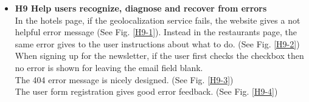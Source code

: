 \begin{itemize}
\begin{figure}[!ht]
\begin{minipage}{\linewidth}
                \centering
                \captionsetup{justification=centering}
                \caption{}
                \label{H8-1}
            \end{minipage}
\end{figure}
\begin{figure}[!ht]
    \begin{minipage}{\linewidth}
        \centering
        \captionsetup{justification=centering}
        \caption{}
        \label{H8-2}
    \end{minipage}
\end{figure}
    \item \textbf{H9 Help users recognize, diagnose and recover from errors}\\
    In the hotels page, if the geolocalization service fails, the website gives a not helpful error message (See Fig. \ref{H9-1}). Instead in the restaurants page, the same error gives to the user instructions about what to do. (See Fig. \ref{H9-2})\\
    When signing up for the newsletter, if the user first checks the checkbox then no error is shown for leaving the email field blank.\\
    The 404 error message is nicely designed. (See Fig. \ref{H9-3})\\
    The user form registration gives good error feedback. (See Fig. \ref{H9-4})
\begin{figure}[!ht]
        \begin{minipage}{\linewidth}
            \centering

\end{minipage}
\end{figure}
\end{itemize}
